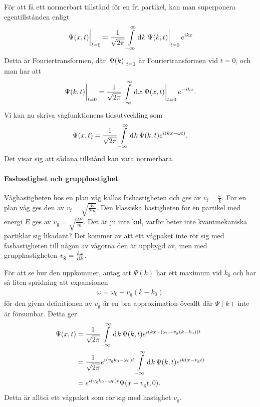 För att få ett normerbart tillstånd för en fri partikel, kan man superponera egentillstånden enligt
\begin{align*}
	\eval{\Psi(x, t)}_{t = 0} = \frac{1}{\sqrt{2\pi}}\integ{-\infty}{\infty}{k}{\eval{\Psi(k, t)}_{t = 0}e^{ikx}}
\end{align*}
Detta är Fouriertransformen, där $\eval{\Psi(k)}_{t = 0}$ är Fouriertransformen vid $t = 0$, och man har att
\begin{align*}
	\eval{\Psi(k, t)}_{t = 0} = \frac{1}{\sqrt{2\pi}}\integ{-\infty}{\infty}{x}{\eval{\Psi(x, t)}_{t = 0}e^{-ikx}}.
\end{align*}
Vi kan nu skriva vågfunktionens tidsutveckling som
\begin{align*}
	\Psi(x, t) = \frac{1}{\sqrt{2\pi}}\int\limits_{-\infty}^{\infty}\dd[]{k}\Psi(k, t)e^{i(kx - \omega t)}.
\end{align*}
Det visar sig att sådana tillstånd kan vara normerbara.

\paragraph{Fashastighet och grupphastighet}
Våghastigheten hos en plan våg kallas fashastigheten och ges av $v_{\text{f}} = \frac{\omega}{k}$. För en plan våg ges den av $v_{\text{f}} = \sqrt{\frac{E}{2m}}$. Den klassiska hastigheten för en partikel med energi $E$ ges av $v_{\text{g}} = \sqrt{\frac{2E}{m}}$. Det är ju inte kul, varför beter inte kvantmekaniska partiklar sig likadant? Det kommer av att ett vågpaket inte rör sig med fashastigheten till någon av vågorna den är uppbygd av, men med grupphastigheten $v_{\text{g}} = \dv{\omega}{k}$.

För att se hur den uppkommer, antag att $\Psi(k)$ har ett maximum vid $k_{0}$ och har så liten spridning att expansionen
\begin{align*}
	\omega = \omega_{0} + v_{\text{g}}(k - k_{0})
\end{align*}
för den givna definitionen av $v_{\text{g}}$ är en bra approximation öveallt där $\Psi(k)$ inte är försumbar. Detta ger
\begin{align*}
	\Psi(x, t) &= \frac{1}{\sqrt{2\pi}}\int\limits_{-\infty}^{\infty}\dd[]{k}\Psi(k, t)e^{i(kx - (\omega_{0} + v_{\text{g}}(k - k_{0}))t} \\
	           &= \frac{1}{\sqrt{2\pi}}e^{i(v_{\text{g}}k_{0} - \omega_{0})t}\int\limits_{-\infty}^{\infty}\dd[]{k}\Psi(k, t)e^{ik(x - v_{\text{g}}t)} \\
	           &= e^{i(v_{\text{g}}k_{0} - \omega_{0})t}\Psi(x - v_{\text{g}}t, 0).
\end{align*}
Detta är alltså ett vågpaket som rör sig med hastighet $v_{\text{g}}$.

